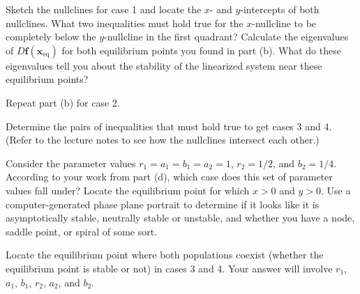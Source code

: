 \documentclass[boxes]{gsypset}
\begin{document}
\begin{problem}
\begin{subproblems}
\begin{solution}
				\end{solution}
			\subproblem 
				Sketch the nullclines for case 1 and locate the $x$- and $y$-intercepts of both nullclines.  
				What two inequalities must hold true for the $x$-nullcline to be 
				completely below the $y$-nullcline in the first quadrant?  
				Calculate the eigenvalues of $D\mathbf{f}(\mathbf{x}_{\text{eq}})$ 
				for both equilibrium points you found in part (b). 
				What do these eigenvalues tell you about the stability of the linearized system 
				near these equilibrium points?
				\begin{solution}
					
				\end{solution}
			\subproblem Repeat part (b) for case 2.
				\begin{solution}
					
				\end{solution}
			\subproblem 
				Determine the pairs of inequalities that must hold true to get cases 3 and 4. 
				(Refer to the lecture notes to see how the nullclines intersect each other.)
				\begin{solution}
					
				\end{solution}
			\subproblem 
				Consider the parameter values $r_1=a_1=b_1=a_2=1$, $r_2=1/2$, and $b_2=1/4$. 
				According to your work from part (d), 
				which case does this set of parameter values fall under? 
				Locate the equilibrium point for which $x>0$ and $y>0$. 
				Use a computer-generated phase plane portrait to determine if it looks like it is 
				asymptotically stable, neutrally stable or unstable, and 
				whether you have a node, saddle point, or spiral of some sort.
				\begin{solution}
					
				\end{solution}
			\subproblem 
				Locate the equilibrium point where both populations coexist 
				(whether the equilibrium point is stable or not) in cases 3 and 4. 
				Your answer will involve $r_1$, $a_1$, $b_1$, $r_2$, $a_2$, and $b_2$.
				\begin{solution}
					
				\end{solution}
		\end{subproblems}
	\end{problem}
\end{document}
